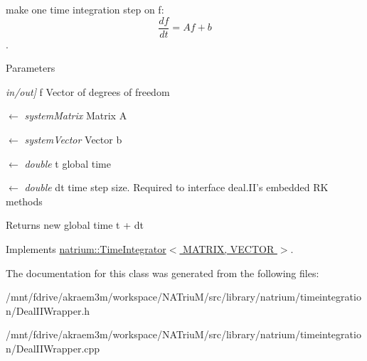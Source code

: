 make one time integration step on f: \[ \frac{df}{dt} = Af+b \]. 
\begin{DoxyParams}{Parameters}
\item[{\em in/out\mbox{]}}]f Vector of degrees of freedom \item[\mbox{$\leftarrow$} {\em systemMatrix}]Matrix A \item[\mbox{$\leftarrow$} {\em systemVector}]Vector b \item[\mbox{$\leftarrow$} {\em double}]t global time \item[\mbox{$\leftarrow$} {\em double}]dt time step size. Required to interface deal.II's embedded RK methods \end{DoxyParams}
\begin{DoxyReturn}{Returns}
new global time t + dt 
\end{DoxyReturn}


Implements \hyperlink{classnatrium_1_1TimeIntegrator_a1c438e41d183d172d524aa5dc97785fb}{natrium::TimeIntegrator$<$ MATRIX, VECTOR $>$}.

The documentation for this class was generated from the following files:\begin{DoxyCompactItemize}
\item 
/mnt/fdrive/akraem3m/workspace/NATriuM/src/library/natrium/timeintegration/DealIIWrapper.h\item 
/mnt/fdrive/akraem3m/workspace/NATriuM/src/library/natrium/timeintegration/DealIIWrapper.cpp\end{DoxyCompactItemize}
